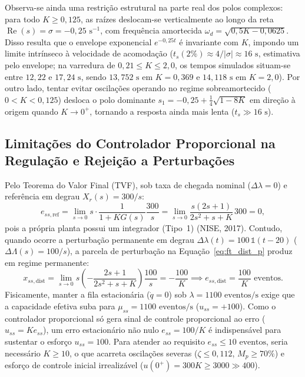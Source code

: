 Observa-se ainda uma restrição estrutural na parte real dos polos complexos: para todo $K \ge 0{,}125$, as raízes deslocam-se verticalmente ao longo da reta $\operatorname{Re}(s) = \sigma = -0{,}25\text{ s}^{-1}$, com frequência amortecida $\omega_d = \sqrt{0{,}5K - 0{,}0625}$. Disso resulta que o envelope exponencial $e^{-0{,}25t}$ é invariante com $K$, impondo um limite intrínseco à velocidade de acomodação ($t_s(2\%) \approx 4/|\sigma| \approx 16\text{ s}$, estimativa pelo envelope; na varredura de $0{,}21 \le K \le 2{,}0$, os tempos simulados situam-se entre $12{,}22$ e $17{,}24\text{ s}$, sendo $13{,}752\text{ s}$ em $K = 0{,}369$ e $14{,}118\text{ s}$ em $K = 2{,}0$). Por outro lado, tentar evitar oscilações operando no regime sobreamortecido ($0 < K < 0{,}125$) desloca o polo dominante $s_1 = -0{,}25 + \frac{1}{4}\sqrt{1-8K}$ em direção à origem quando $K \to 0^+$, tornando a resposta ainda mais lenta ($t_s \gg 16\text{ s}$).

\subsection{Limitações do Controlador Proporcional na Regulação e Rejeição a Perturbações}\label{sec:limitacoes_p}
Pelo Teorema do Valor Final (TVF), sob taxa de chegada nominal ($\Delta\lambda = 0$) e referência em degrau $X_r(s) = 300/s$:
\begin{equation}
    e_{ss,\text{ref}} = \lim_{s\to 0} s \cdot \frac{1}{1 + K G(s)} \frac{300}{s} = \lim_{s\to 0} \frac{s(2s+1)}{2s^2 + s + K}\,300 = 0,
\end{equation}
pois a própria planta possui um integrador (Tipo~1) (NISE, 2017). Contudo, quando ocorre a perturbação permanente em degrau $\Delta\lambda(t) = 100\,\mathbb{1}(t - 20)$ ($\Delta\Lambda(s) = 100/s$), a parcela de perturbação na Equação~\eqref{eq:ft_dist_p} produz em regime permanente:
\begin{equation}
    x_{ss,\text{dist}} = \lim_{s\to 0} s \left(-\frac{2s+1}{2s^2+s+K}\right)\frac{100}{s} = -\frac{100}{K}
    \implies e_{ss,\text{dist}} = \frac{100}{K}\text{ eventos}.
    \label{eq:ess_dist_p}
\end{equation}
Fisicamente, manter a fila estacionária ($\dot{q}=0$) sob $\lambda = 1100\text{ eventos/s}$ exige que a capacidade efetiva suba para $\mu_{ss} = 1100\text{ eventos/s}$ ($u_{ss} = +100$). Como o controlador proporcional só gera sinal de controle proporcional ao erro ($u_{ss} = K e_{ss}$), um erro estacionário não nulo $e_{ss} = 100/K$ é indispensável para sustentar o esforço $u_{ss}=100$. Para atender ao requisito $e_{ss} \le 10\text{ eventos}$, seria necessário $K \ge 10$, o que acarreta oscilações severas ($\zeta \le 0{,}112$, $M_p \ge 70\%$) e esforço de controle inicial irrealizável ($u(0^+) = 300K \ge 3000 \gg 400$).

